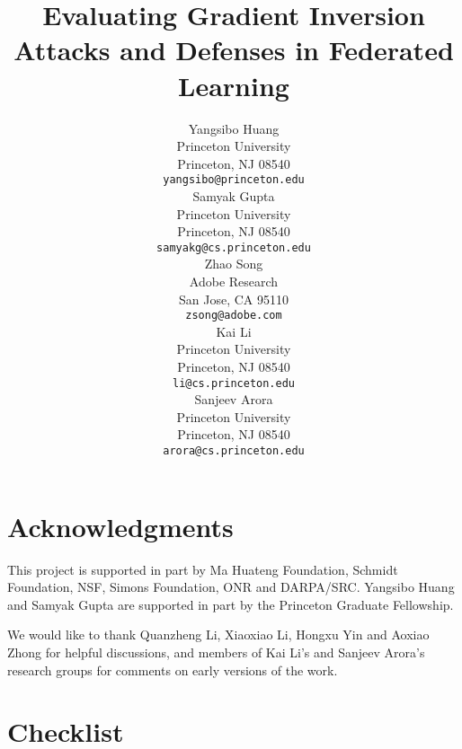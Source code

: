 \documentclass{article}
\title{Evaluating Gradient Inversion Attacks and Defenses in Federated Learning}
\author{%
  Yangsibo Huang\\
  Princeton University\\
  Princeton, NJ 08540 \\
  \texttt{yangsibo@princeton.edu} \\
  
  \And
  Samyak Gupta\\
  Princeton University\\
  Princeton, NJ 08540 \\
  \texttt{samyakg@cs.princeton.edu} \\
  
  \And
  Zhao Song\\
  Adobe Research\\
  San Jose, CA 95110 \\
  \texttt{zsong@adobe.com} \\
  
  \And
  Kai Li\\
  Princeton University\\
  Princeton, NJ 08540 \\
  \texttt{li@cs.princeton.edu} \\
  
  \And
  Sanjeev Arora\\
  Princeton University\\
  Princeton, NJ 08540 \\
  \texttt{arora@cs.princeton.edu} \\
}
\begin{document}
\maketitle













\newpage
\section*{Acknowledgments}
This project is supported in part by 
Ma Huateng Foundation, Schmidt Foundation, 
NSF, Simons Foundation, ONR and DARPA/SRC. 
Yangsibo Huang and Samyak Gupta are supported in part by the Princeton Graduate Fellowship.

We would like to thank Quanzheng Li, Xiaoxiao Li, Hongxu Yin and Aoxiao Zhong for helpful discussions, and members of Kai Li's and Sanjeev Arora's research groups for comments on early versions of the work. 





\iffalse
\section*{Checklist}

\end{document}
